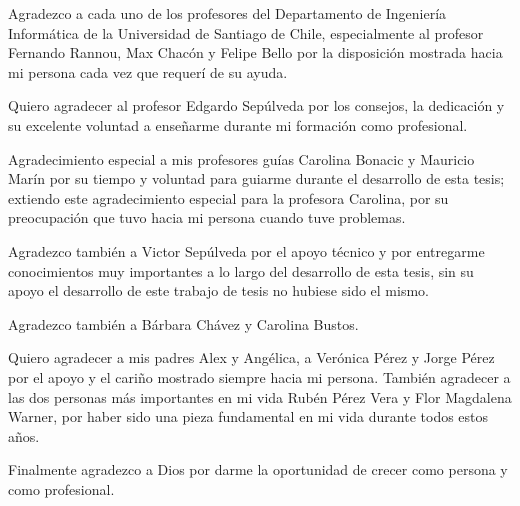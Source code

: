 \begin{gracias}
Agradezco a cada uno de los profesores del Departamento de Ingeniería Informática de la Universidad de Santiago de Chile, especialmente al profesor Fernando Rannou, Max Chacón y Felipe Bello por la disposición mostrada hacia mi persona cada vez que requerí de su ayuda. 

Quiero agradecer al profesor Edgardo Sepúlveda por los consejos, la dedicación y su excelente voluntad a enseñarme durante mi formación como profesional.

Agradecimiento especial a mis profesores guías Carolina Bonacic y Mauricio Marín por su tiempo y voluntad para guiarme durante el desarrollo de esta tesis; extiendo este agradecimiento especial para la profesora Carolina, por su preocupación que tuvo hacia mi persona cuando tuve problemas. 

Agradezco también a Victor Sepúlveda por el apoyo técnico y por entregarme conocimientos muy importantes a lo largo del desarrollo de esta tesis, sin su apoyo el desarrollo de este trabajo de tesis no hubiese sido el mismo.

Agradezco también a Bárbara Chávez y Carolina Bustos.

Quiero agradecer a mis padres Alex y Angélica, a Verónica Pérez y Jorge Pérez por el apoyo y el cariño mostrado siempre hacia mi persona. También agradecer a las dos personas más importantes en mi vida Rubén Pérez Vera y Flor Magdalena Warner, por haber sido una pieza fundamental en mi vida durante todos estos años.

Finalmente agradezco a Dios por darme la oportunidad de crecer como persona y como profesional.

\end{gracias}